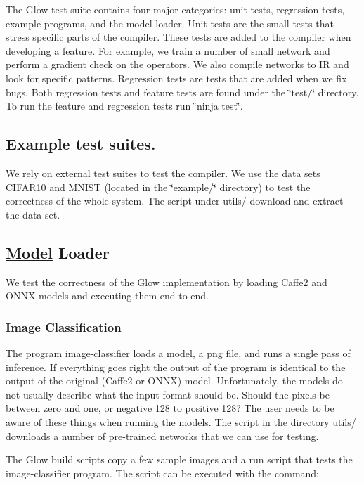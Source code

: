 The Glow test suite contains four major categories\+: unit tests, regression tests, example programs, and the model loader. Unit tests are the small tests that stress specific parts of the compiler. These tests are added to the compiler when developing a feature. For example, we train a number of small network and perform a gradient check on the operators. We also compile networks to IR and look for specific patterns. Regression tests are tests that are added when we fix bugs. Both regression tests and feature tests are found under the \char`\"{}test/\char`\"{} directory. To run the feature and regression tests run \char`\"{}ninja test\char`\"{}.

\subsection*{Example test suites.}

We rely on external test suites to test the compiler. We use the data sets C\+I\+F\+A\+R10 and M\+N\+I\+ST (located in the \char`\"{}example/\char`\"{} directory) to test the correctness of the whole system. The script under \textquotesingle{}utils/\textquotesingle{} download and extract the data set.

\subsection*{\hyperlink{struct_model}{Model} Loader}

We test the correctness of the Glow implementation by loading Caffe2 and O\+N\+NX models and executing them end-\/to-\/end.

\subsubsection*{Image Classification}

The program {\ttfamily image-\/classifier} loads a model, a png file, and runs a single pass of inference. If everything goes right the output of the program is identical to the output of the original (Caffe2 or O\+N\+NX) model. Unfortunately, the models do not usually describe what the input format should be. Should the pixels be between zero and one, or negative 128 to positive 128? The user needs to be aware of these things when running the models. The script in the directory \textquotesingle{}utils/\textquotesingle{} downloads a number of pre-\/trained networks that we can use for testing.

The Glow build scripts copy a few sample images and a run script that tests the {\ttfamily image-\/classifier} program. The script can be executed with the command\+:


